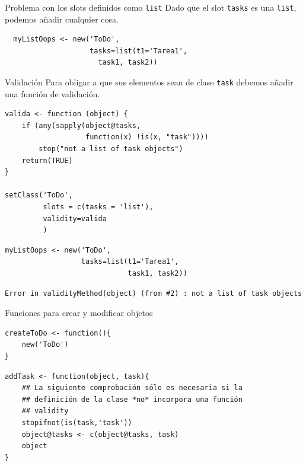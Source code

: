 \documentclass[xcolor={usenames,svgnames,dvipsnames}]{beamer}
\begin{document}
\begin{frame}[fragile,label={sec:orgheadline28}]{Problema con los slots definidos como \texttt{list}}
 Dado que el slot \texttt{tasks} es una \texttt{list}, podemos añadir cualquier
cosa. 
\lstset{language=R,label= ,caption= ,captionpos=b,numbers=none}
\begin{lstlisting}
  myListOops <- new('ToDo',
                    tasks=list(t1='Tarea1',
                      task1, task2))
\end{lstlisting}
\end{frame}

\begin{frame}[fragile,label={sec:orgheadline29}]{Validación}
 Para obligar a que sus elementos sean de clase \texttt{task} debemos añadir
una función de validación.
\lstset{language=R,label= ,caption= ,captionpos=b,numbers=none}
\begin{lstlisting}
valida <- function (object) {
    if (any(sapply(object@tasks,
                   function(x) !is(x, "task")))) 
        stop("not a list of task objects")
    return(TRUE)
}

setClass('ToDo',
         slots = c(tasks = 'list'),
         validity=valida
         )
\end{lstlisting}

\lstset{language=R,label= ,caption= ,captionpos=b,numbers=none}
\begin{lstlisting}
myListOops <- new('ToDo',
                  tasks=list(t1='Tarea1',
                             task1, task2))
\end{lstlisting}

\begin{verbatim}
Error in validityMethod(object) (from #2) : not a list of task objects
\end{verbatim}
\end{frame}

\begin{frame}[fragile,label={sec:orgheadline30}]{Funciones para crear y modificar objetos}
 \lstset{language=R,label= ,caption= ,captionpos=b,numbers=none}
\begin{lstlisting}
createToDo <- function(){
    new('ToDo')
}
\end{lstlisting}

\lstset{language=R,label= ,caption= ,captionpos=b,numbers=none}
\begin{lstlisting}
addTask <- function(object, task){
    ## La siguiente comprobación sólo es necesaria si la
    ## definición de la clase *no* incorpora una función 
    ## validity
    stopifnot(is(task,'task'))
    object@tasks <- c(object@tasks, task)
    object
}
\end{lstlisting}
\end{frame}
\end{document}
